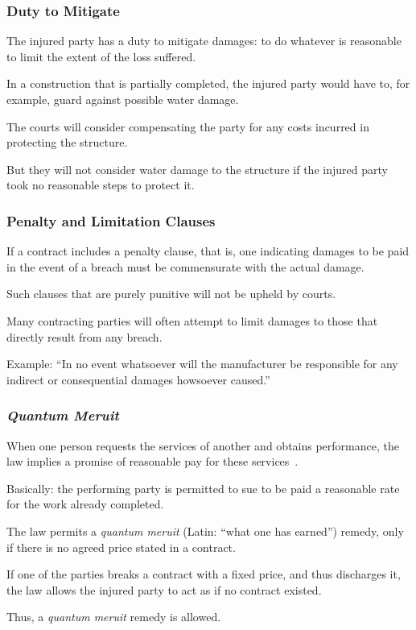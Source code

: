 \begin{frame}
\frametitle{Duty to Mitigate}

The injured party has a \alert{duty to mitigate} damages: to do whatever is reasonable to limit the extent of the loss suffered.

In a construction that is partially completed, the injured party would have to, for example, guard against possible water damage.

The courts will consider compensating the party for any costs incurred in protecting the structure. 

But they will not consider water damage to the structure if the injured party took no reasonable steps to protect it.

\end{frame}



\begin{frame}
\frametitle{Penalty and Limitation Clauses}

If a contract includes a \alert{penalty clause}, that is, one indicating damages to be paid in the event of a breach must be commensurate with the actual damage.

Such clauses that are purely punitive will not be upheld by courts.

Many contracting parties will often attempt to limit damages to those that directly result from any breach.

Example: ``In no event whatsoever will the manufacturer be responsible for any indirect or consequential damages howsoever caused.''

\end{frame}



\begin{frame}
\frametitle{\textit{Quantum Meruit}}

When one person requests the services of another and obtains performance, the law implies a promise of reasonable pay for these services~\cite{lba}.

Basically: the performing party is permitted to sue to be paid a reasonable rate for the work already completed.

The law permits a \textit{quantum meruit} (Latin: ``what one has earned'') remedy, only if there is no agreed price stated in a contract.

If one of the parties breaks a contract with a fixed price, and thus discharges it, the law allows the injured party to act as if no contract existed.

Thus, a \textit{quantum meruit} remedy is allowed.

\end{frame}



